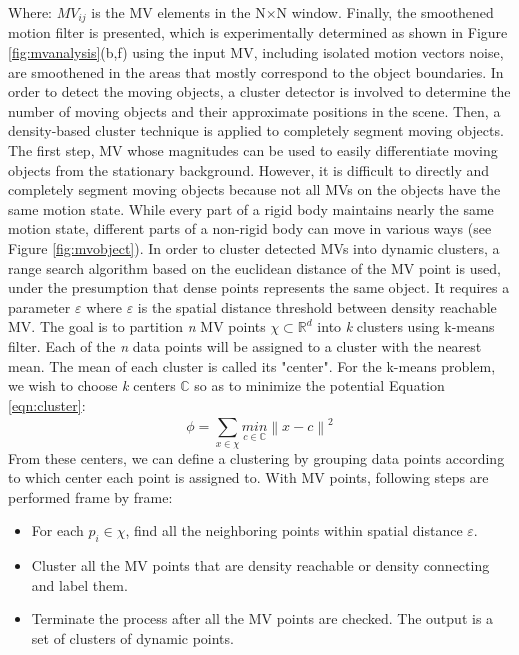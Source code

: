 Where: $MV_{ij}$ is the MV elements in the N×N window. Finally, the smoothened motion filter is presented, which is experimentally determined as shown in Figure \ref{fig:mvanalysis}(b,f) using the input MV, including isolated motion vectors noise, are smoothened in the areas that mostly correspond to the object boundaries. In order to detect the moving objects, a cluster detector is involved to determine the number of moving objects and their approximate positions in the scene. Then, a density-based cluster technique is applied to completely segment moving objects. The first step, MV whose magnitudes can be used to easily differentiate moving objects from the stationary background. However, it is difficult to directly and completely segment moving objects because not all MVs on the objects have the same motion state. While every part of a rigid body maintains nearly the same motion state, different parts of a non-rigid body can move in various ways (see Figure \ref{fig:mvobject}). In order to cluster detected MVs into dynamic clusters, a range search algorithm based on the euclidean distance of the MV point is used, under the presumption that dense points represents the same object. It requires a parameter $\varepsilon$ where $\varepsilon$ is the spatial distance threshold between density reachable MV. The goal is to partition \textit{n} MV points $\chi \subset \mathbb{R}^{d}$ into \textit{k} clusters using k-means filter. Each of the \textit{n} data points will be assigned to a cluster with the nearest mean. The mean of each cluster is called its "center". For the k-means problem, we wish to choose \textit{k} centers $\mathbb{C}$ so as to minimize the potential Equation \ref{eqn:cluster}: \\
\begin{equation}
\label{eqn:cluster}
\phi = \sum_{x \in \chi}^{}\underset{c \in \mathbb{C}}{min}\left \| x - c \right \|^{2}
\end{equation} 
From these centers, we can define a clustering by grouping data points according to which center each point is assigned to. With MV points, following steps are performed frame by frame:
\begin{itemize}
\item For each $p_{i} \in \chi$, find all the neighboring points within spatial distance $\varepsilon$.
\item Cluster all the MV points that are density reachable or density connecting \cite{ester1996density} and label them.
\item Terminate the process after all the MV points are checked. The output is a set of clusters of dynamic points.
\end{itemize}
